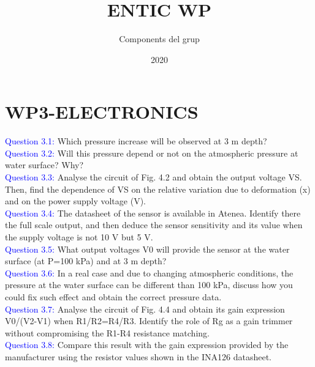 \documentclass[12pt, a4papre]{article}
\author{Components del grup}
\title{ENTIC WP}
\date{2020}
\begin{document}
	
	\maketitle
	\newpage
	\section{WP3-ELECTRONICS}
	
	\textcolor{blue}{Question 3.1:} Which pressure increase will be observed at 3 m depth?\\

	\textcolor{blue}{Question 3.2:} Will this pressure depend or not on the atmospheric pressure at water surface? Why?\\

	\textcolor{blue}{Question 3.3:} Analyse the circuit of Fig. 4.2 and obtain the output voltage VS. Then, find the dependence of VS on the relative 	variation due to deformation (x) and on the power supply voltage (V). \\

	\textcolor{blue}{Question 3.4:} The datasheet of the sensor is available in Atenea. Identify there the full scale output, and then deduce the sensor sensitivity and its value when the supply voltage is not 10 V but 5 V.\\

	\textcolor{blue}{Question 3.5:} What output voltages V0 will provide the sensor at the water surface (at P=100 kPa) and at 3 m depth? \\

	\textcolor{blue}{Question 3.6:} In a real case and due to changing atmospheric conditions, the pressure at the water surface can be different than 100 kPa, discuss how you could fix such effect and obtain the correct pressure data. \\

	\textcolor{blue}{Question 3.7:} Analyse the circuit of Fig. 4.4 and obtain its gain expression V0/(V2-V1) when R1/R2=R4/R3.  Identify the role of Rg as a gain trimmer without compromising the R1-R4 resistance matching.\\

	\textcolor{blue}{Question 3.8:} Compare this result with the gain expression provided by the manufacturer using the resistor values shown in the INA126 datasheet.\\
	
\end{document}
